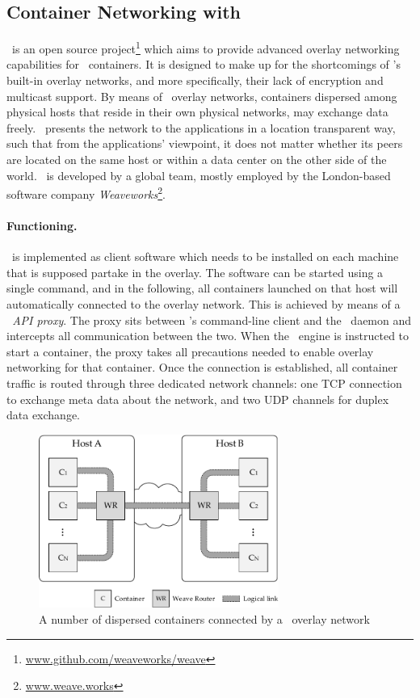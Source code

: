 
\subsection{Container Networking with \wnet}

\wnet\ is an open source project\footnote{\url{www.github.com/weaveworks/weave}} which aims to provide advanced overlay networking capabilities for \docker\ containers. It is designed to make up for the shortcomings of \docker 's built-in overlay networks, and more specifically, their lack of encryption and multicast support. By means of \docker\ overlay networks, containers dispersed among physical hosts that reside in their own physical networks, may exchange data freely. \wnet\ presents the network to the applications in a location transparent way, such that from the applications' viewpoint, it does not matter whether its peers are located on the same host or within a data center on the other side of the world. \wnet\ is developed by a global team, mostly employed by the London-based software company \emph{Weaveworks}\footnote{\url{www.weave.works}}.


\paragraph{Functioning.}
\wnet\ is implemented as client software which needs to be installed on each machine that is supposed partake in the overlay. The software can be started using a single command, and in the following, all containers launched on that host will automatically connected to the overlay network. This is achieved by means of a \emph{\docker\ API proxy}. The proxy sits between \docker 's command-line client and the \docker\ daemon and intercepts all communication between the two. When the \docker\ engine is instructed to start a container, the proxy takes all precautions needed to enable overlay networking for that container. Once the connection is established, all container traffic is routed through three dedicated network channels: one TCP connection to exchange meta data about the network, and two UDP channels for duplex data exchange.


\begin{figure}[htpb]
  \centering
  \includegraphics[width=0.7\textwidth]{figures/weave.pdf}
  \caption[An example of containers connected via \wnet\ overlay network]{A number of dispersed containers connected by a \wnet\ overlay network}\label{fig:weavescheme} 
\end{figure}

